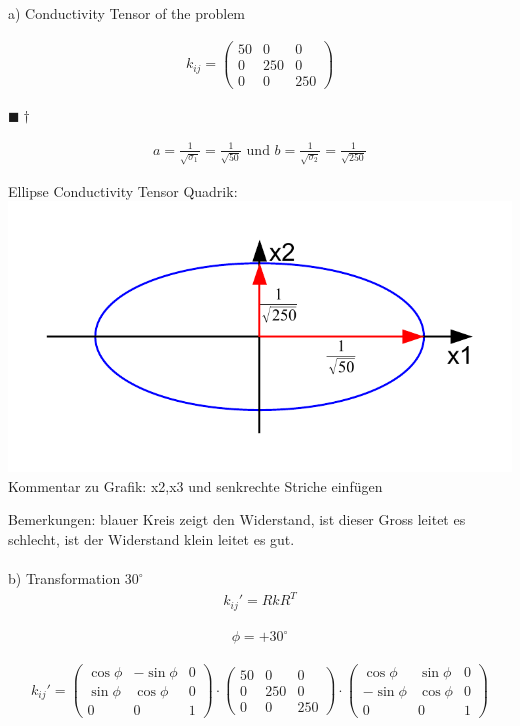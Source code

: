 \documentclass[a4paper, 10pt]{scrartcl}
\newcommand{\qed}{\begin{flushright}
		$\blacksquare \dagger$ \end{flushright}}
\begin{document}
a) Conductivity Tensor of the problem

\begin{align}
	k_{ij}=\begin{pmatrix}
		50 & 0 & 0 \\
		0 & 250 & 0 \\
		0 & 0 & 250 
	\end{pmatrix}
\end{align}
\qed
\begin{align}
	a = \frac{1}{\sqrt{\sigma_1}} = \frac{1}{\sqrt{50}} \text{ und } b =
	\frac{1}{\sqrt{\sigma_2}} = \frac{1}{\sqrt{250}}
\end{align}

\begin{center}
	Ellipse Conductivity Tensor Quadrik:\\
	\includegraphics[scale=0.8]{images/quadrik_2d_ellipse_uebung.pdf}\\
	Kommentar zu Grafik: x2,x3 und senkrechte Striche einfügen\\
\end{center}
Bemerkungen: blauer Kreis zeigt den Widerstand, ist dieser Gross leitet es schlecht, ist der Widerstand klein leitet es gut.
\\
\\
b) Transformation $30^\circ$
\begin{align}
	k_{ij}'=RkR^{T}
\end{align}

\begin{align}
	\phi=+30^\circ
\end{align}

\begin{align}
	k_{ij}'=\begin{pmatrix}
		\cos{\phi} & -\sin{\phi} & 0 \\
		\sin{\phi} & \cos{\phi} & 0 \\
		0 & 0 & 1
	\end{pmatrix}
	\cdot
	\begin{pmatrix}
		50 & 0 & 0 \\
		0 & 250 & 0 \\
		0 & 0 & 250 
	\end{pmatrix}
	\cdot
	\begin{pmatrix}
		\cos{\phi} & \sin{\phi} & 0 \\
		-\sin{\phi} & \cos{\phi} & 0 \\
		0 & 0 & 1
	\end{pmatrix}
\end{align}
\end{document}
